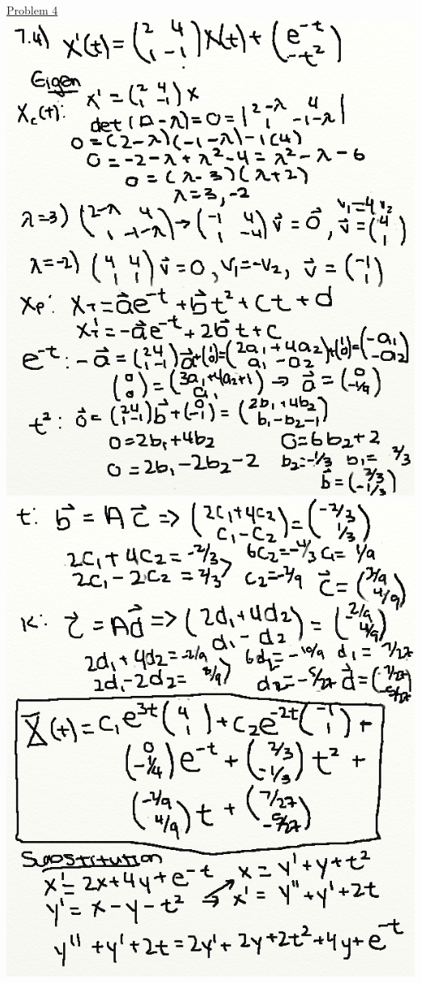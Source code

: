 \documentclass{article}
\begin{document}
\underline{Problem 4}\newline{}
\includegraphics[width=\textwidth,height=\textheight,keepaspectratio]{homework7q4p1.png}\clearpage{}
\includegraphics[width=\textwidth,height=\textheight,keepaspectratio]{homework7q4p2.png}\clearpage{}
\end{document}

